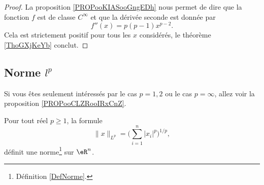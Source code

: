 \begin{proof}
    La proposition \ref{PROPooKIASooGngEDh} nous permet de dire que la fonction \( f\) est de classe \(  C^{\infty}\) et que la dérivée seconde est donnée par
    \begin{equation}
        f''(x)=p(p-1)x^{p-2}.
    \end{equation}
    Cela est strictement positif pour tous les \( x\) considérés, le théorème \ref{ThoGXjKeYb} conclut.
\end{proof}

\subsection{Norme \( l^p\)}

Si vous êtes seulement intéressés par le cas \( p=1,2\) ou le cas \( p=\infty\), allez voir la proposition \ref{PROPooCLZRooIRxCnZ}.
\begin{proposition}     \label{PROPooUDFTooQyhAtq}
    Pour tout réel \( p\geq 1\), la formule
    \begin{equation}        \label{EqDeformeLp}
        \| x \|_{L^p}=\Big( \sum_{i=1}^n| x_i |^p\Big)^{1/p},
    \end{equation}
    définit une norme\footnote{Définition \ref{DefNorme}.} sur \( \eR^n\).
\end{proposition}

